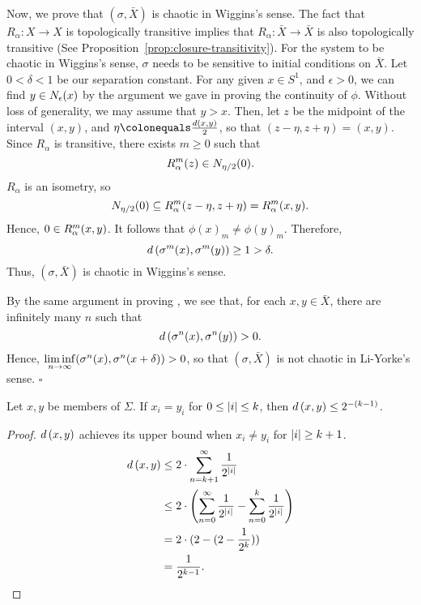 \documentclass[10pt,twoside,draft]{book}
\begin{document}
\begin{example}
  Now, we prove that $(\sigma, \bar{X})$ is chaotic in Wiggins's sense.
  The fact that $R_\alpha: X \to X$ is topologically transitive implies that $R_\alpha: \bar{X} \to \bar{X}$ is also topologically transitive (See Proposition~\ref{prop:closure-transitivity}).
  For the system to be chaotic in Wiggins's sense, $\sigma$ needs to be sensitive to initial conditions on $\bar{X}$.
  Let $0 < \delta < 1$ be our separation constant.
  For any given $x \in S^1$, and $\epsilon > 0$, we can find $y \in N_{\epsilon}(x)$ by the argument we gave in proving the continuity of $\phi$.
  Without loss of generality, we may assume that $y > x$.
  Then, let $z$ be the midpoint of the interval $(x,y)$, and $\eta \ceq \frac{\metric{x,y}}{2}$, so that $(z-\eta, z+\eta) = (x,y)$.
  Since $R_\alpha$ is transitive, there exists $m \geq 0$ such that 
  \begin{equation*}
    R_\alpha^{m}(z) \in N_{\eta/2}(0).
  \end{equation*}
  $R_\alpha$ is an isometry, so
  \begin{equation*}
    N_{\eta/2}(0) \subseteq R_\alpha^{m}(z-\eta, z+\eta) 
    = R_\alpha^{m}(x,y).
  \end{equation*}
  Hence, $0 \in R_\alpha^{m}(x,y)$.
  It follows that $\phi(x)_m \neq \phi(y)_m$.
  Therefore,
  \begin{equation*}
    d\left( \sigma^{m}(x), \sigma^{m}(y) \right) \geq 1 > \delta.
  \end{equation*}
  Thus, $(\sigma, \bar{X})$ is chaotic in Wiggins's sense.
  
  By the same argument in proving \sdic, we see that, for each $x,y \in \bar{X}$, there are infinitely many $n$ such that 
  \begin{equation*}
    d\left( \sigma^{n}(x),\sigma^{n}(y) \right) > 0.
  \end{equation*}
  Hence, $\liminf\limits_{n \to \infty} (\sigma^{n}(x), \sigma^{n}(x+\delta)) > 0$, so that $(\sigma, \bar{X})$ is not chaotic in Li-Yorke's sense.
  $\square$
\end{example}
\begin{proposition}
  Let $x,y$ be members of $\Sigma$.
  If $x_i = y_i$ for $0 \leq \left | i \right | \leq k$, then $d\left( x,y \right) \leq 2^{-(k-1)}$.
  \label{prop:two-sided}
  \begin{proof}
    $d\left( x,y \right)$ achieves its upper bound when $x_i \neq y_i$ for $\left | i \right | \geq k+1$.
    \begin{align*}
      d\left( x,y \right)
      &\leq 2 \cdot \sum\limits_{n = k+1}^{\infty} \frac{1}{2^{\left | i \right |}} \\
      &\leq 2 \cdot \left (  \sum\limits_{n = 0}^{\infty} \frac{1}{2^{\left | i \right |}} - \sum\limits_{n = 0}^{k} \frac{1}{2^{\left | i \right |}} \right ) \\
      &= 2 \cdot (2 - (2 - \frac{1}{2^k})) \\
      &= \frac{1}{2^{k-1}}.
    \end{align*}
  \end{proof}
\end{proposition}
\end{document}

